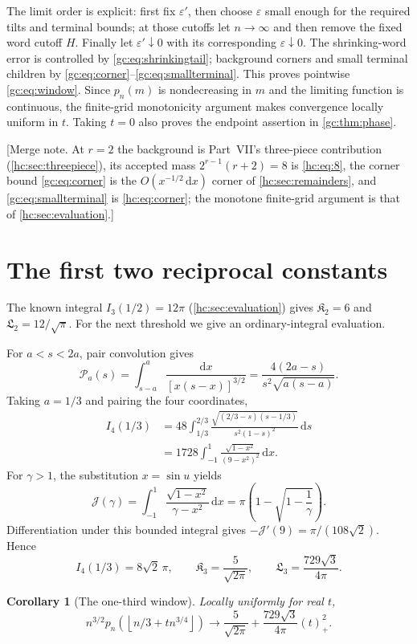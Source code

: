 \documentclass[11pt,a4paper]{article}
\newtheorem{corollary}[corollary]{Corollary}
\theoremstyle{definition}\newaliascnt{definition}{theorem}
\theoremstyle{remark}\newaliascnt{remark}{theorem}
\newcommand{\dd}{\mathrm d}
\newcommand{\prpos}[1]{(#1)_+}
\begin{document}
The limit order is explicit: first fix $\varepsilon'$, then choose
$\varepsilon$ small enough for the required tilts and terminal bounds; at those
cutoffs let $n\to\infty$ and then remove the fixed word cutoff $H$. Finally let
$\varepsilon'\downarrow0$ with its corresponding $\varepsilon\downarrow0$. The
shrinking-word error is controlled by \eqref{gc:eq:shrinkingtail}; background
corners and small terminal children by
\eqref{gc:eq:corner}--\eqref{gc:eq:smallterminal}. This proves pointwise
\eqref{gc:eq:window}. Since $p_n(m)$ is nondecreasing in $m$ and the limiting
function is continuous, the finite-grid monotonicity argument makes
convergence locally uniform in $t$. Taking $t=0$ also proves the endpoint
assertion in \cref{gc:thm:phase}.

[Merge note. At $r=2$ the background is Part~VII's three-piece contribution
(\cref{hc:sec:threepiece}), its accepted mass $2^{r-1}(r+2)=8$ is
\eqref{hc:eq:8}, the corner bound \eqref{gc:eq:corner} is the
$O(x^{-1/2}\,\dd x)$ corner of \cref{hc:sec:remainders}, and
\eqref{gc:eq:smallterminal} is \eqref{hc:eq:corner}; the monotone finite-grid
argument is that of \cref{hc:sec:evaluation}.]

\section{The first two reciprocal constants}
\label{gc:sec:constants}
The known integral $I_3(1/2)=12\pi$ (\cref{hc:sec:evaluation}) gives
$\mathfrak K_2=6$ and $\mathfrak L_2=12/\sqrt\pi$. For the next threshold we
give an ordinary-integral evaluation.

For $a<s<2a$, pair convolution gives
\[
 \mathcal P_a(s)=\int_{s-a}^{a}\frac{\dd x}{[x(s-x)]^{3/2}}
       =\frac{4(2a-s)}{s^2\sqrt{a(s-a)}}.
\]
Taking $a=1/3$ and pairing the four coordinates,
\begin{align*}
 I_4(1/3)
 &=48\int_{1/3}^{2/3}
       \frac{\sqrt{(2/3-s)(s-1/3)}}{s^2(1-s)^2}\,\dd s\\
 &=1728\int_{-1}^1\frac{\sqrt{1-x^2}}{(9-x^2)^2}\,\dd x.
\end{align*}
For $\gamma>1$, the substitution $x=\sin u$ yields
\[
 \mathcal J(\gamma)=\int_{-1}^1\frac{\sqrt{1-x^2}}{\gamma-x^2}\,\dd x
     =\pi\left(1-\sqrt{1-\frac1\gamma}\right).
\]
Differentiation under this bounded integral gives
$-\mathcal J'(9)=\pi/(108\sqrt2)$. Hence
\[
 I_4(1/3)=8\sqrt2\,\pi,\qquad
 \mathfrak K_3=\frac5{\sqrt{2\pi}},\qquad
 \mathfrak L_3=\frac{729\sqrt3}{4\pi}.
\]
\begin{corollary}[The one-third window]\label{gc:cor:third}
Locally uniformly for real $t$,
\[
 n^{3/2}p_n\!\left(\left\lfloor n/3+t n^{3/4}\right\rfloor\right)
 \longrightarrow\frac5{\sqrt{2\pi}}
               +\frac{729\sqrt3}{4\pi}\prpos t^2.
\]
\end{corollary}
\end{document}
